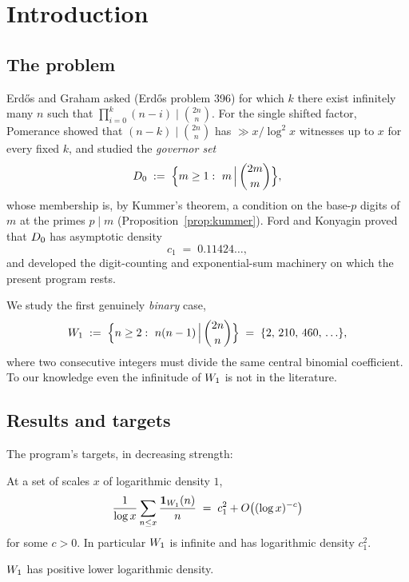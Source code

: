 \section{Introduction}\label{sec:intro}

\subsection{The problem}

Erd\H{o}s and Graham \cite{ErGr80} asked (Erd\H{o}s problem 396) for which
$k$ there exist infinitely many $n$ such that
$\prod_{i=0}^{k}(n-i)\mid\binom{2n}{n}$. For the single shifted factor,
Pomerance \cite{Pom15} showed that $(n-k)\mid\binom{2n}{n}$ has
$\gg x/\log^2 x$ witnesses up to $x$ for every fixed $k$, and studied the
\emph{governor set}
\[
D_0 \;:=\; \Big\{m\ge1:\ m\,\Big|\,\binom{2m}{m}\Big\},
\]
whose membership is, by Kummer's theorem, a condition on the base-$p$
digits of $m$ at the primes $p\mid m$
(Proposition~\ref{prop:kummer}). Ford and Konyagin \cite{FK21} proved that
$D_0$ has asymptotic density
\[
c_1 \;=\; 0.11424\ldots,
\]
and developed the digit-counting and exponential-sum machinery on which the
present program rests.

We study the first genuinely \emph{binary} case,
\[
\W \;:=\; \Big\{n\ge2:\ n(n-1)\,\Big|\,\binom{2n}{n}\Big\}
\;=\;\{2,\,210,\,460,\,\ldots\},
\]
where two consecutive integers must divide the same central binomial
coefficient. To our knowledge even the infinitude of $W_1$ is not in the
literature.

\subsection{Results and targets}

The program's targets, in decreasing strength:

\begin{theorem}\label{thm:main}
\statusO\quad
At a set of scales $x$ of logarithmic density $1$,
\[
\frac{1}{\log x}\sum_{n\le x}\frac{\mathbf 1_{W_1}(n)}{n}
\;=\; c_1^2 + O\big((\log x)^{-c}\big)
\]
for some $c>0$. In particular $W_1$ is infinite and has logarithmic density
$c_1^2$.
\end{theorem}

\begin{theorem}\label{thm:lower}
\statusO\quad
$W_1$ has positive lower logarithmic density.
\end{theorem}


